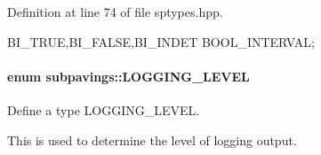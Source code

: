 \-Definition at line 74 of file sptypes.\-hpp.


\begin{DoxyCode}
{BI_TRUE,BI_FALSE,BI_INDET} BOOL_INTERVAL;
\end{DoxyCode}
\hypertarget{namespacesubpavings_aef8e51096b59ecaf1a1e9b2ee24b6089}{
\paragraph[{\-L\-O\-G\-G\-I\-N\-G\-\_\-\-L\-E\-V\-E\-L}]{\setlength{\rightskip}{0pt plus 5cm}enum {\bf subpavings\-::\-L\-O\-G\-G\-I\-N\-G\-\_\-\-L\-E\-V\-E\-L}}}\label{namespacesubpavings_aef8e51096b59ecaf1a1e9b2ee24b6089}


\-Define a type \-L\-O\-G\-G\-I\-N\-G\-\_\-\-L\-E\-V\-E\-L. 

\-This is used to determine the level of logging output.

